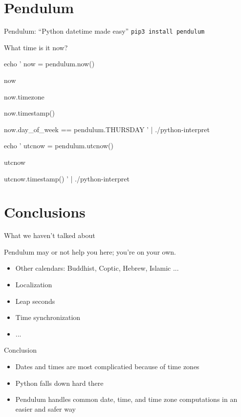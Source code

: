 \documentclass[xcolor=svgnames,17pt]{beamer}
\newcommand*{\sizefont}[1]{%
    \ifcase#1\relax
    \or \tiny
    \or \scriptsize
    \or \footnotesize
    \or \small
    \or \normalsize
    \or \large
    \or \Large
    \or \LARGE
    \or \huge
    \or \Huge
    \fi}
\begin{document}
\section{Pendulum}

\begin{frame}
\tableofcontents[currentsection]
\end{frame}

\begin{frame}{Pendulum: “Python datetime made easy”}
\texttt{pip3 install pendulum}
\end{frame}

\begin{frame}[fragile]{What time is it now?}

{\sizefont{3}
\bash[stdout]
echo '
now = pendulum.now()


now


now.timezone


now.timestamp()


now.day_of_week == pendulum.THURSDAY
' | ./python-interpret
\END
}

\pause

{\sizefont{3}
\bash[stdout]
echo '
utcnow = pendulum.utcnow()


utcnow


utcnow.timestamp()
' | ./python-interpret
\END
}

\end{frame}

\section{Conclusions}

\begin{frame}
\tableofcontents[currentsection]
\end{frame}

\begin{frame}{What we haven’t talked about}

Pendulum may or not help you here; you’re on your own.

\pause

\begin{itemize}
\item Other calendars: Buddhist, Coptic, Hebrew, Islamic ...
\item Localization
\item Leap seconds
\item Time synchronization
\item ...
\end{itemize}
\end{frame}

\begin{frame}{Conclusion}
\begin{itemize}
\item Dates and times are most complicatied because of time zones
\item Python falls down hard there
\item Pendulum handles common date, time, and time zone computations in an
easier and safer way
\end{itemize}
\end{frame}
\end{document}
